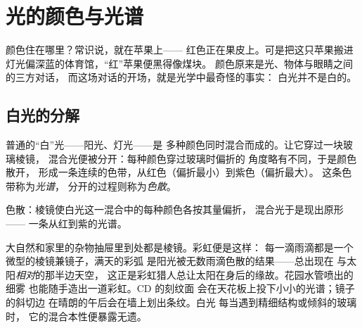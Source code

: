 \chapter{光的颜色与光谱}\label{ch:g8:colors-spectra}

颜色住在哪里？常识说，就在苹果上——
红色正在果皮上。可是把这只苹果搬进
灯光偏深蓝的体育馆，“红”苹果便黑得像煤块。
颜色原来是光、物体与眼睛之间的三方对话，
而这场对话的开场，就是光学中最奇怪的事实：
白光并不是白的。

\section{白光的分解}

\begin{proposition}[白光是一种混合光]\label{prop:g8:colors-spectra:mixture}
普通的“白”光——阳光、灯光——是
多种颜色同时混合而成的。让它穿过一块玻璃棱镜，
混合光便被分开：每种颜色穿过玻璃时偏折的
角度略有不同，于是颜色散开，
形成一条连续的色带，从红色（偏折最小）到紫色（偏折最大）。
这条色带称为\emph{光谱}，
分开的过程则称为\emph{色散}。
\end{proposition}

\begin{omfigure}

{\small 色散：棱镜使白光这一混合中的每种颜色各按其量偏折，
混合光于是现出原形——
一条从红到紫的光谱。}
\end{omfigure}

\begin{example}[不借助实验室的光谱]\label{ex:g8:colors-spectra:everyday}
大自然和家里的杂物抽屉里到处都是棱镜。彩虹便是这样：
每一滴雨滴都是一个微型的棱镜兼镜子，满天的彩弧
是阳光被无数雨滴色散的结果——总出现在
与太阳\emph{相对}的那半边天空，
这正是彩虹猎人总让太阳在身后的缘故。花园水管喷出的细雾
也能随手造出一道彩虹。CD 的刻纹面
会在天花板上投下小小的光谱；镜子的斜切边
在晴朗的午后会在墙上划出条纹。白光
每当遇到精细结构或倾斜的玻璃时，
它的混合本性便暴露无遗。
\end{example}


